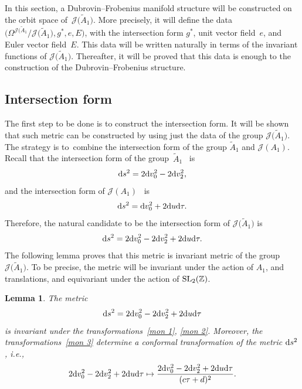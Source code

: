 \documentclass[pdftex]{sigma}%
\numberwithin{equation}{section}
\newtheorem{Lemma}[Theorem]{Lemma}
\newcommand{\Ja}{\mathcal{J}}
\begin{document}
In this section, a Dubrovin--Frobenius manifold structure will be constructed on the orbit space of~$\Ja\big(\tilde A_1\big)$. More precisely, it will define the data $\big(\Omega^{\Ja(\tilde A_1}/\Ja\big(\tilde A_1\big),g^{*},e,E\big)$, with the intersection form $g^*$, unit vector field~$e$, and Euler vector field~$E$. This data will be written naturally in terms of the invariant functions of $\Ja\big(\tilde A_1\big)$. Thereafter, it will be proved that this data is enough to the construction of the Dubrovin--Frobenius structure.


\subsection{Intersection form}

The first step to be done is to construct the intersection form. It will be shown that such metric can be constructed by using just the data of the group $\Ja\big(\tilde A_1\big)$. The strategy is to~combine the intersection form of the group $\tilde A_1$ and $\Ja(A_1)$. Recall that the intersection form of the group~$\tilde A_1$~\cite{B.Dubrovin2, B.DubrovinandY.Zhang} is
\begin{gather*}
{\rm d}s^2=2{\rm d}v_0^2-2{\rm d}v_2^2,
\end{gather*}
and the intersection form of $\Ja(A_1)$~\cite{BertolaM.1, BertolaM.2, B.Dubrovin2} is
\begin{gather*}
{\rm d}s^2={\rm d}v_0^2+2{\rm d}u {\rm d}\tau.
\end{gather*}
Therefore, the natural candidate to be the intersection form of $\Ja\big(\tilde A_1\big)$ is
\begin{gather*}
{\rm d}s^2=2{\rm d}v_0^2-2{\rm d}v_2^2+2{\rm d}u {\rm d}\tau.
\end{gather*}
The following lemma proves that this metric is invariant metric of the group $\Ja\big(\tilde A_1\big)$. To be precise, the metric will be invariant under the action of $A_1$, and translations, and equivariant under the action of ${\rm SL}_2(\mathbb{Z})$.

\begin{Lemma}
The metric
\begin{gather}\label{metrich100}
{\rm d}s^2=2{\rm d}v_0^2-2{\rm d}v_2^2+2{\rm d}u {\rm d}\tau
\end{gather}
is invariant under the transformations~\eqref{mon 1}, \eqref{mon 2}.
Moreover, the transformations~\eqref{mon 3} deter\-mine a conformal transformation of the metric ${\rm d}s^2$, i.e.,
\begin{gather*}
2{\rm d}v_0^2-2{\rm d}v_2^2+2{\rm d}u {\rm d}\tau\mapsto \frac{2{\rm d}v_0^2-2{\rm d}v_2^2+2{\rm d}u {\rm d}\tau}{(c\tau+d)^2}.
\end{gather*}
\end{Lemma}
\end{document}
